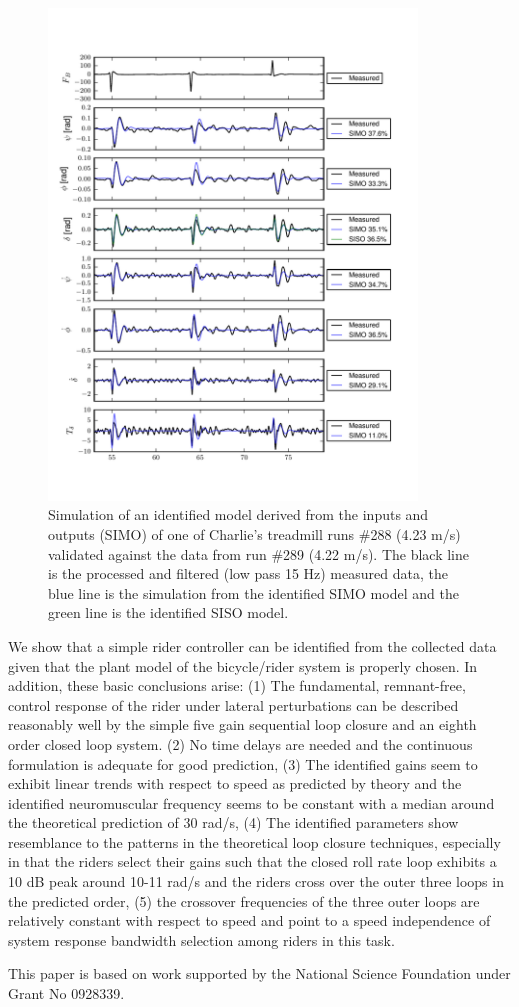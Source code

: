 \documentclass[a4paper]{article}
\begin{document}
\begin{figure}[htb]
  \centering
  \includegraphics[width=3.85in]{rider-id-treadmill-run.pdf}
  \caption{Simulation of an identified model derived from the inputs and
  outputs (SIMO) of one of Charlie's treadmill runs \#288 (4.23 m/s) validated
  against the data from run \#289 (4.22 m/s). The black line is the processed
  and filtered (low pass 15 Hz) measured data, the blue line is the simulation
  from the identified SIMO model and the green line is the identified SISO
  model.}
  \label{fig}
\end{figure}

We show that a simple rider controller can be identified from the collected
data given that the plant model of the bicycle/rider system is properly chosen.
In addition, these basic conclusions arise: (1) The fundamental, remnant-free,
control response of the rider under lateral perturbations can be described
reasonably well by the simple five gain sequential loop closure and an eighth
order closed loop system. (2) No time delays are needed and the continuous
formulation is adequate for good prediction, (3) The identified gains seem to
exhibit linear trends with respect to speed as predicted by theory and the
identified neuromuscular frequency seems to be constant with a median around
the theoretical prediction of 30 rad/s, (4) The identified parameters show
resemblance to the patterns in the theoretical loop closure techniques,
especially in that the riders select their gains such that the closed roll rate
loop exhibits a 10 dB peak around 10-11 rad/s and the riders cross over the
outer three loops in the predicted order, (5) the crossover frequencies of the
three outer loops are relatively constant with respect to speed and point to a
speed independence of system response bandwidth selection among riders in this
task.

This paper is based on work supported by the National Science Foundation under
Grant No 0928339.



\end{document}
